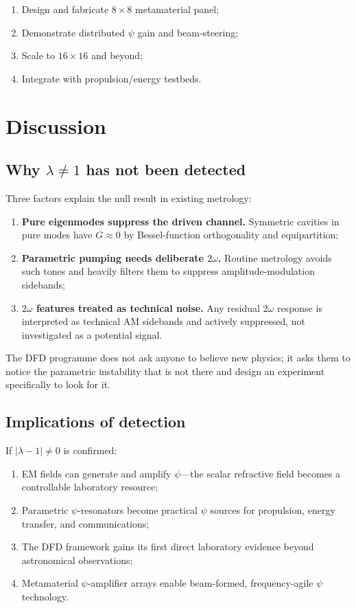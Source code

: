 \documentclass[12pt,aps,prd,twocolumn,superscriptaddress,nofootinbib]{revtex4-2}
\begin{document}
\begin{enumerate}[noitemsep]
  \item Design and fabricate $8\times 8$ metamaterial panel;
  \item Demonstrate distributed $\psi$ gain and beam-steering;
  \item Scale to $16\times 16$ and beyond;
  \item Integrate with propulsion/energy testbeds.
\end{enumerate}


\section{Discussion}
\label{sec:discussion}

\subsection{Why $\lambda \neq 1$ has not been detected}

Three factors explain the null result in existing metrology:
\begin{enumerate}
  \item \textbf{Pure eigenmodes suppress the driven channel.}
    Symmetric cavities in pure modes have $G \approx 0$ by
    Bessel-function orthogonality and equipartition;
  \item \textbf{Parametric pumping needs deliberate $2\omega$.}
    Routine metrology avoids such tones and heavily filters them
    to suppress amplitude-modulation sidebands;
  \item \textbf{$2\omega$ features treated as technical noise.}
    Any residual $2\omega$ response is interpreted as technical AM
    sidebands and actively suppressed, not investigated as a
    potential signal.
\end{enumerate}

The DFD programme does not ask anyone to believe new physics;
it asks them to notice the parametric instability that is not there
and design an experiment specifically to look for it.

\subsection{Implications of detection}

If $|\lambda - 1| \neq 0$ is confirmed:
\begin{enumerate}[noitemsep]
  \item EM fields can generate and amplify $\psi$---the scalar
    refractive field becomes a controllable laboratory resource;
  \item Parametric $\psi$-resonators become practical $\psi$ sources
    for propulsion, energy transfer, and communications;
  \item The DFD framework gains its first direct laboratory evidence
    beyond astronomical observations;
  \item Metamaterial $\psi$-amplifier arrays enable beam-formed,
    frequency-agile $\psi$ technology.
\end{enumerate}
\end{document}
